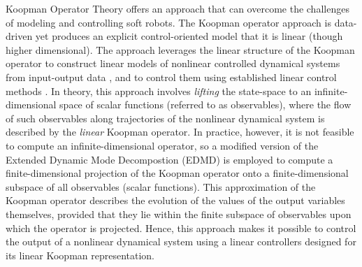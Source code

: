 
Koopman Operator Theory offers an approach that can overcome the challenges of modeling and controlling soft robots.
The Koopman operator approach is data-driven yet produces an explicit control-oriented model that it is linear (though higher dimensional).
The approach leverages the linear structure of the Koopman operator to construct linear models of nonlinear controlled dynamical systems from input-output data \cite{bruder2018nonlinear, mauroy2016linear}, and to control them using established linear control methods \cite{Abraham-RSS-17, korda2018linear}.
In theory, this approach involves \emph{lifting} the state-space to an infinite-dimensional space of scalar functions (referred to as observables), where the flow of such observables along trajectories of the nonlinear dynamical system is described by the \emph{linear} Koopman operator.
In practice, however, it is not feasible to compute an infinite-dimensional operator, so a modified version of the Extended Dynamic Mode Decompostion (EDMD) is employed to compute a finite-dimensional projection of the Koopman operator onto a finite-dimensional subspace of all observables (scalar functions).
This approximation of the Koopman operator describes the evolution of the values of the output variables themselves, provided that they lie within the finite subspace of observables upon which the operator is projected.
Hence, this approach makes it possible to control the output of a nonlinear dynamical system using a linear controllers designed for its linear Koopman representation.

